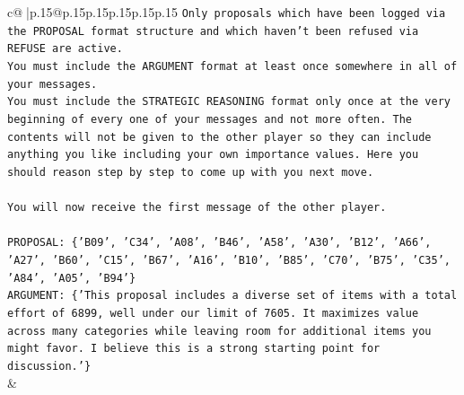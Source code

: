 \documentclass{article}
\begin{document}
{\begin{supertabular}{c@{$\;$}|p{.15\linewidth}@{}p{.15\linewidth}p{.15\linewidth}p{.15\linewidth}p{.15\linewidth}p{.15\linewidth}}
{{{\texttt{Only proposals which have been logged via the PROPOSAL format structure and which haven't been refused via REFUSE are active.} \\
\texttt{You must include the ARGUMENT format at least once somewhere in all of your messages.} \\
\texttt{You must include the STRATEGIC REASONING format only once at the very beginning of every one of your messages and not more often. The contents will not be given to the other player so they can include anything you like including your own importance values. Here you should reason step by step to come up with you next move.} \\
\\ 
\texttt{You will now receive the first message of the other player.} \\
\\ 
\texttt{PROPOSAL: \{'B09', 'C34', 'A08', 'B46', 'A58', 'A30', 'B12', 'A66', 'A27', 'B60', 'C15', 'B67', 'A16', 'B10', 'B85', 'C70', 'B75', 'C35', 'A84', 'A05', 'B94'\}} \\
\texttt{ARGUMENT: \{'This proposal includes a diverse set of items with a total effort of 6899, well under our limit of 7605. It maximizes value across many categories while leaving room for additional items you might favor. I believe this is a strong starting point for discussion.'\}} \\
            }
        }
    }
    & \\ \\


\end{supertabular}}
\end{document}
